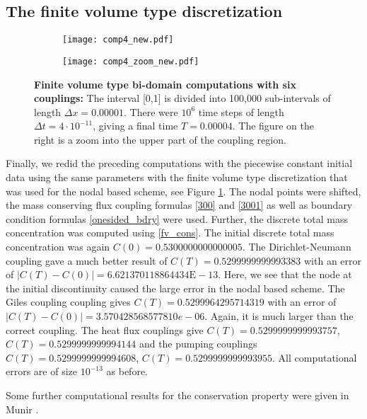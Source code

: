 %
%
\subsection*{The finite volume type discretization}
%
%


%
\begin{figure}
%
\begin{subfigure}{.49\textwidth}
  \centering
  \texttt{[image: comp4\_new.pdf]}
  \caption{}
\end{subfigure}
%
\begin{subfigure}{.49\textwidth}
  \centering
  \texttt{[image: comp4\_zoom\_new.pdf]}
  \caption{}
\end{subfigure}
%
\caption{\textbf{Finite volume type bi-domain computations with six couplings:} 
\label{comp4}
The interval [0,1] is divided into 100,000 sub-intervals of length $\Delta x=0.00001$. 
There were $10^6$ time steps of length $\Delta t=4\cdot 10^{-11}$, giving a final time $T=0.00004$. 
The figure on the right is a zoom into the upper part of the coupling region.}
%
\end{figure}


Finally, we redid the preceding computations with the piecewise constant initial data 
using the same parameters with the finite volume type discretization
that was used for the nodal based scheme, see Figure \ref{comp4}.
The nodal points were shifted, the mass conserving flux coupling formulas
\eqref{300} and \eqref{3001} as well as boundary condition
formulas \eqref{onesided_bdry} were used. Further, the discrete total mass concentration was
computed using \eqref{fv_cons}. The initial discrete total mass concentration was again $C(0)=0.5300000000000005$.
The Dirichlet-Neumann coupling gave a much better result of $C(T)=0.5299999999993383$ with an error of
$|C(T)-C(0)|=6.621370118864434\text{E}-13$. Here, we see that the node at the initial discontinuity caused the large
error in the nodal based scheme. The Giles coupling coupling gives 
$C(T)= 0.5299964295714319$ with an error of  $|C(T)-C(0)|=3.570428568577810e-06$. 
Again, it is much larger than the correct coupling. The heat flux couplings give $C(T)=0.5299999999993757$,
$C(T)=0.5299999999994144$ and the pumping couplings $C(T)=0.5299999999994608$,
$C(T)=0.5299999999993955$. All computational errors are of size $10^{-13}$
as before.

Some further computational results for the conservation property were given in Munir \cite[Section 5.5]{MUN}. 

